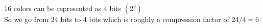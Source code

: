 \begin{answer}\\
16 colors can be represented as 4 bits $(2^4)$\\
So we go from 24 bits to 4 bits which is roughly a compression factor of $24/4=6$\\
\end{answer}
